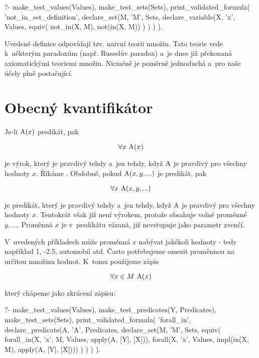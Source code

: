 \begin{prolog}
?- 	make_test_values(Values),
	make_test_sets(Sets),
	print_validated_formula(
		'not_in_set_definition',
		declare_set(M, 'M', Sets,
			declare_variable(X, 'x', Values,
				equiv(
					not_in(X, M),
					not(in(X, M))
				)
			)
		)
	).
\end{prolog}

Uvedené definice odpovídají tzv. naivní teorii množin. Tato teorie vede k~některým paradoxům (např. Russelův paradox) a~je dnes již překonaná axiomatickými teoriemi množin. Nicméně je poměrně jednoduchá a~pro naše účely plně postačující. 

\section{Obecný kvantifikátor}

Je-li \(\mathrm{A}(x)\) predikát, pak

\begin{equation}
\forall x \ \predicate{A}(x)
\end{equation}

je výrok, který je pravdivý tehdy a~jen tehdy, když \(\mathrm{A}\) je pravdivý pro všechny hodnoty \(x\). Říkáme . Obdobně, pokud \(\mathrm{A}(x, y, ...)\) je predikát, pak

\begin{equation}
\forall x \ \mathrm{A}(x, y, ...)
\end{equation}

je predikát, který je pravdivý tehdy a~jen tehdy, když \(\mathrm{A}\) je pravdivý pro všechny hodnoty \(x\). Tentokrát však již není výrokem, protože obsahuje volné proměnné \(y, ...\). Proměnná \(x\) je v~predikátu vázaná, již nevstupuje jako parametr zvenčí.

V~uvedených příkladech může proměnná \(x\) nabývat jakékoli hodnoty - tedy například 1, -2.5, automobil atd. Často potřebujeme omezit proměnnou na určitou množinu hodnot. K~tomu použijeme zápis

\begin{equation}
\forall x \in M \ \predicate{A}(x)
\end{equation}

který chápeme jako zkrácení zápisu:

\begin{prolog}
?- 	make_test_values(Values),
	make_test_predicates(Y, Predicates),
	make_test_sets(Sets),
	print_validated_formula(
		'forall_in',
		declare_predicate(A, 'A', Predicates,
			declare_set(M, 'M', Sets,
				equiv(
					forall_in(X, 'x', M, Values, apply(A, [Y], [X])),
					forall(X, 'x', Values, impl(in(X, M), apply(A, [Y], [X])))
				)
			)
		)
	).
\end{prolog}

